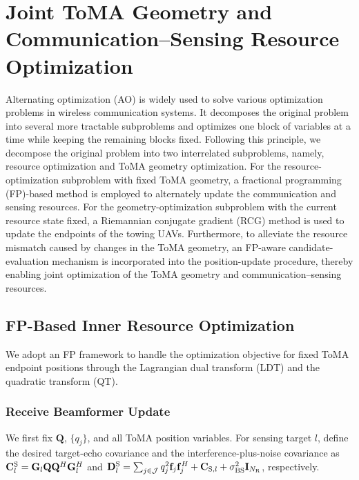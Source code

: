 \documentclass[letterpaper,journal]{IEEEtran}
\begin{document}
\section{Joint ToMA Geometry and Communication--Sensing Resource Optimization}
\label{sec:joint_optimization}

Alternating optimization (AO) is widely used to solve various optimization problems in wireless communication systems. It decomposes the original problem into several more tractable subproblems and optimizes one block of variables at a time while keeping the remaining blocks fixed. Following this principle, we decompose the original problem into two interrelated subproblems, namely, resource optimization and ToMA geometry optimization. For the resource-optimization subproblem with fixed ToMA geometry, a fractional programming (FP)-based method is employed to alternately update the communication and sensing resources. For the geometry-optimization subproblem with the current resource state fixed, a Riemannian conjugate gradient (RCG) method is used to update the endpoints of the towing UAVs. Furthermore, to alleviate the resource mismatch caused by changes in the ToMA geometry, an FP-aware candidate-evaluation mechanism is incorporated into the position-update procedure, thereby enabling joint optimization of the ToMA geometry and communication--sensing resources.

\subsection{FP-Based Inner Resource Optimization}
\label{subsec:fp_resource}

We adopt an FP framework to handle the optimization objective for fixed ToMA endpoint positions through the Lagrangian dual transform (LDT) and the quadratic transform (QT).

\subsubsection{Receive Beamformer Update}

We first fix $\mathbf Q$, $\{q_j\}$, and all ToMA position variables. For sensing target $l$, define the desired target-echo covariance and the interference-plus-noise covariance as $\mathbf C_l^{\rm S}=\mathbf G_l\mathbf Q\mathbf Q^H\mathbf G_l^H$ and $\mathbf D_l^{\rm S}=\sum_{j\in\mathcal J}q_j^2\mathbf f_j\mathbf f_j^H+\mathbf C_{{\rm S},l}+\sigma_{\rm BS}^2\mathbf I_{N_{\rm R}}$, respectively.
\end{document}
